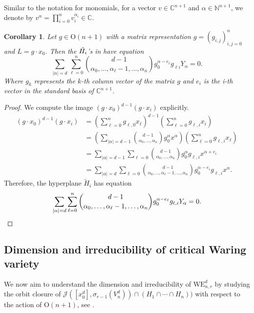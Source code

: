 \documentclass{amsart}
\numberwithin{theorem}{section}
\newtheorem{corollary}[theorem]{Corollary}
\theoremstyle{definition}
\newcommand{\CC}{\mathbb{C}}
\newcommand{\NN}{\mathbb{N}}
\begin{document}
Similar to the notation for monomials, for a vector $v\in \CC^{n+1}$ and $\alpha\in\NN^{n+1}$, we denote by $v^\alpha=\prod_{i=0}^n v_i^{\alpha_i}\in\CC$.
\begin{corollary}
    Let $g\in \mathrm O(n+1)$ with a matrix representation $g=(g_{i,j})_{i,j=0}^n$ and $L=g\cdot x_0$. Then the $\Tilde{H_i}$'s in  have equation $$
    \sum_{|\alpha|=d}\sum_{\ell=0}^n\binom{d-1}{\alpha_0,\dots,\alpha_\ell-1,\dots,\alpha_n}g_0^{\alpha-e_\ell}g_{\ell i}Y_\alpha=0.
    $$
    Where $g_k$ represents the $k$-th column vector of the matrix $g$ and $e_i$ is the i-th vector in the standard basis of $\CC^{n+1}$.

\end{corollary}
\begin{proof} 
We compute  the image $(g\cdot x_0)^{d-1}(g\cdot x_i)$ explicitly.  
    \begin{align*}
        (g\cdot x_0)^{d-1}(g\cdot x_i)&=\left(\sum_{\ell=0}^n g_{\ell,0}x_\ell\right)^{d-1}\left(\sum_{\ell=0}^n g_{\ell ,i}x_i\right)\\
        &= \left(\sum_{|\alpha|=d-1}\binom{d-1}{\alpha_0,\dots,\alpha_n}g_0^\alpha x^\alpha\right)\left(\sum_{\ell=0}^n g_{\ell, i}x_\ell\right)\\
        &=\sum_{|\alpha|=d-1}\sum_{\ell=0}\binom{d-1}{\alpha_0,\dots,\alpha_n}g_0^\alpha g_{\ell ,i}x^{\alpha+e_i}\\
        &=\sum_{|\alpha|=d}\sum_{\ell=0}\binom{d-1}{\alpha_0,\dots,\alpha_\ell - 1,\dots,\alpha_n}g_0^{\alpha-e_i} g_{\ell ,i}x^{\alpha}.
    \end{align*}
    Therefore, the hyperplane $\tilde{H}_i$ has equation \[
    \sum_{|\alpha|=d}\sum_{\ell=0}^n\binom{d-1}{\alpha_0,\dots,\alpha_\ell-1,\dots,\alpha_n}g_0^{\alpha-e_\ell}g_{\ell, i}Y_\alpha=0.\qedhere
    \]
\end{proof}



\subsection{{Dimension and irreducibility of critical Waring variety}}

We now aim to understand the dimension and irreducibility of $\mathrm{WE}_{n,r}^d$ by studying the orbit closure of $\mathcal{J}( [x_0^d],\sigma_{r-1}(V^d_n))\cap (H_1\cap \cdots \cap H_n))$ with respect to the action of $\mathrm{O}(n+1)$, see .
\end{document}
